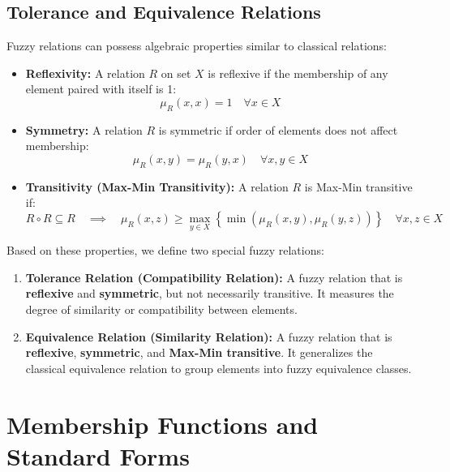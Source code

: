 \documentclass[12pt,a4paper]{article}
\begin{document}
\subsection{Tolerance and Equivalence Relations}
Fuzzy relations can possess algebraic properties similar to classical relations:
\begin{itemize}[leftmargin=*, itemsep=3.5pt]
  \item \textbf{Reflexivity:} A relation $R$ on set $X$ is reflexive if the membership of any element paired with itself is 1:
    \begin{equation}
      \mu_R(x, x) = 1 \quad \forall x \in X
    \end{equation}
  \item \textbf{Symmetry:} A relation $R$ is symmetric if order of elements does not affect membership:
    \begin{equation}
      \mu_R(x, y) = \mu_R(y, x) \quad \forall x, y \in X
    \end{equation}
  \item \textbf{Transitivity (Max-Min Transitivity):} A relation $R$ is Max-Min transitive if:
    \begin{equation}
      R \circ R \subseteq R \quad \implies \quad \mu_R(x, z) \ge \max_{y \in X} \left\{ \min\left( \mu_R(x, y), \mu_R(y, z) \right) \right\} \quad \forall x, z \in X
    \end{equation}
\end{itemize}

Based on these properties, we define two special fuzzy relations:
\begin{enumerate}[leftmargin=*, itemsep=3.5pt]
  \item \textbf{Tolerance Relation (Compatibility Relation):} A fuzzy relation that is \textbf{reflexive} and \textbf{symmetric}, but not necessarily transitive. It measures the degree of similarity or compatibility between elements.
  \item \textbf{Equivalence Relation (Similarity Relation):} A fuzzy relation that is \textbf{reflexive}, \textbf{symmetric}, and \textbf{Max-Min transitive}. It generalizes the classical equivalence relation to group elements into fuzzy equivalence classes.
\end{enumerate}

\section{Membership Functions and Standard Forms}
\end{document}
